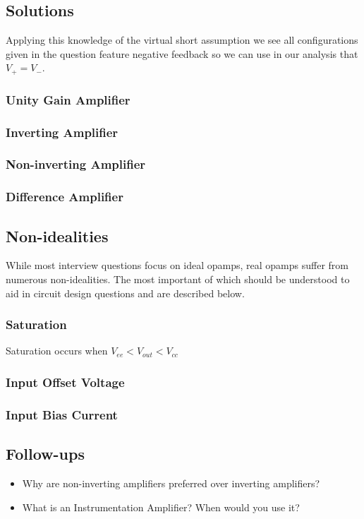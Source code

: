 \documentclass[main.tex]{subfiles}
\begin{document}

\subsection{Solutions}
Applying this knowledge of the virtual short assumption we see all configurations given in the question feature negative feedback so we can use in our analysis that $V_{+} = V_{-}$. 

\subsubsection{Unity Gain Amplifier}

\subsubsection{Inverting Amplifier}

\subsubsection{Non-inverting Amplifier}

\subsubsection{Difference Amplifier}

\subsection{Non-idealities}
While most interview questions focus on ideal opamps, real opamps suffer from numerous non-idealities. The most important of which should be understood to aid in circuit design questions and are described below. 

\subsubsection{Saturation}
Saturation occurs when 
$V_{ee} < V_{out} < V_{cc}$

\subsubsection{Input Offset Voltage}

\subsubsection{Input Bias Current}

\subsection{Follow-ups}
\begin{itemize}
    \item Why are non-inverting amplifiers preferred over inverting amplifiers? %
    \item What is an Instrumentation Amplifier? When would you use it? %
\end{itemize}
\end{document}
